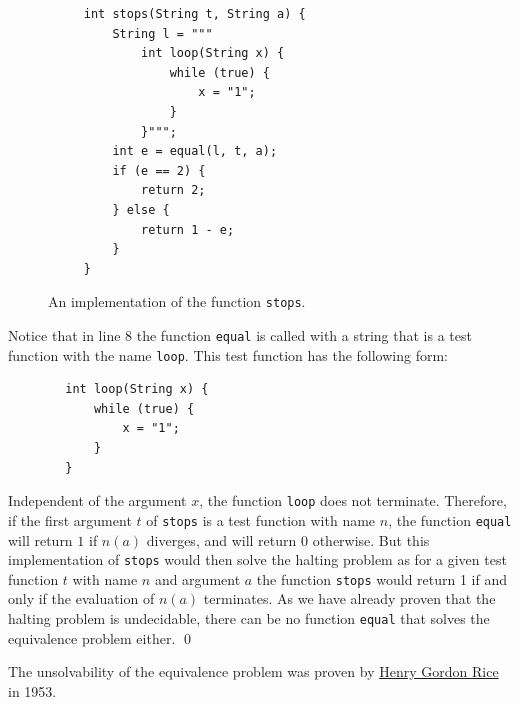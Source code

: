 \begin{figure}[!h]
  \centering
\begin{verbatim}
     int stops(String t, String a) {
         String l = """
             int loop(String x) {
                 while (true) {
                     x = "1";
                 }
             }""";
         int e = equal(l, t, a);
         if (e == 2) {
             return 2;
         } else {
             return 1 - e;
         }
     }
\end{verbatim}
  \vspace*{-0.3cm}
  \caption{An implementation of the function \texttt{stops}.}
  \label{fig:stops}
\end{figure}

Notice that in line 8 the function \texttt{equal} is called with a string that is a test function with the
name \texttt{loop}.
This test function has the following form:
\begin{verbatim}
        int loop(String x) {
            while (true) {
                x = "1";
            }
        }
\end{verbatim}
Independent of the argument $x$, the function \texttt{loop} does not terminate.
Therefore, if the first argument $t$ of \texttt{stops} is a test function with name $n$, 
the function \texttt{equal} will return $1$ if $n(a)$ diverges, and will return $0$ otherwise.
But this implementation of \texttt{stops} would then solve the halting problem as
for a given test function $t$ with name $n$ and argument $a$ the function \texttt{stops} would
return 1 if and only if the evaluation of $n(a)$ terminates.
As we have already proven that the
halting problem is undecidable, there can be no function \texttt{equal} that solves the equivalence
problem either.
\qed

\remarkEng
The unsolvability of the equivalence problem was proven by \href{http://en.wikipedia.org/wiki/Henry_Gordon_Rice}{Henry Gordon Rice} \cite{rice:1953} in 1953.
\eox


